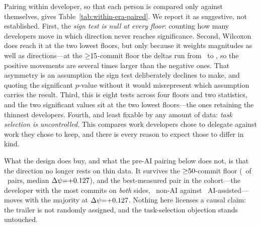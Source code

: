 Pairing within developer, so that each person is compared only against themselves, gives Table~\ref{tab:within-era-paired}. We report it as suggestive, not established. First, the \emph{sign test is null at every floor}: counting how many developers move in which direction never reaches significance. Second, Wilcoxon does reach it at the two lowest floors, but only because it weights magnitudes as well as directions---at the ${\ge}15$-commit floor the deltas run from \statPCWithinFBDeltaMin\ to \statPCWithinFBDeltaMax, so the positive movements are several times larger than the negative ones. That asymmetry is an assumption the sign test deliberately declines to make, and quoting the significant $p$-value without it would misrepresent which assumption carries the result. Third, this is eight tests across four floors and two statistics, and the two significant values sit at the two lowest floors---the ones retaining the thinnest developers. Fourth, and least fixable by any amount of data: \emph{task selection is uncontrolled}. This compares work developers chose to delegate against work they chose to keep, and there is every reason to expect those to differ in kind.

What the design does buy, and what the pre-AI pairing below does not, is that the direction no longer rests on thin data. It survives the ${\ge}50$-commit floor (\statPCWithinFDHigher\ of \statPCWithinFDPairs\ pairs, median $\Delta\psi{=}{+}0.127$), and the best-measured pair in the cohort---the developer with the most commits on \emph{both} sides, \statPCWithinTopVolNonAI\ non-AI against \statPCWithinTopVolAI\ AI-assisted---moves with the majority at $\Delta\psi{=}{+}0.127$. Nothing here licenses a causal claim: the trailer is not randomly assigned, and the task-selection objection stands untouched.


